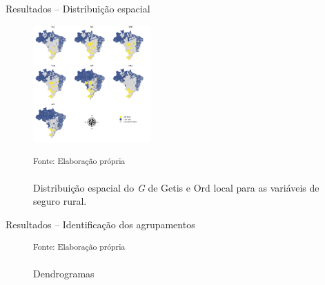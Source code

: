 \documentclass[aspectratio=169]{beamer}
\begin{document}
\begin{frame}{Resultados -- Distribuição espacial}
    \begin{figure}[h]
    	\centering
    	\includegraphics[width=0.4\textwidth]{img/map_getis_ord_variaveis.png}
    	\caption{Distribuição espacial do \textit{G} de Getis e Ord local para as variáveis de seguro rural.}
    	\noindent \small \textsuperscript{Fonte: Elaboração própria}
    \end{figure}
\end{frame}

\begin{frame}{Resultados -- Identificação dos agrupamentos}
	\begin{figure}
		\centering
		\footnotesize
		\hspace{0.2cm}
    	\caption{Dendrogramas}\label{Dendrogramas}
	    \noindent \small \textsuperscript{Fonte: Elaboração própria}
	\end{figure}
\end{frame}
\end{document}
